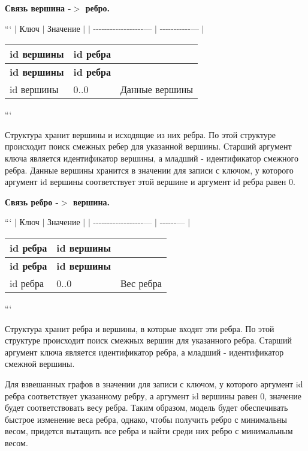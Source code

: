 \begin{DoxyEnumerate}
\item {\bfseries Связь вершина -\/$>$ ребро.}

``` $\vert$ Ключ $\vert$ Значение $\vert$ $\vert$ -\/-\/-\/-\/-\/-\/-\/-\/-\/-\/-\/-\/-\/-\/-\/-\/-\/-\/--- $\vert$ -\/-\/-\/-\/-\/-\/-\/-\/-\/-\/-\/--- $\vert$ \tabulinesep=1mm
\begin{longtabu} spread 0pt [c]{*{3}{|X[-1]}|}
\hline
\rowcolor{\tableheadbgcolor}\textbf{ id вершины }&\textbf{ id ребра }&\textbf{ }\\
\endfirsthead
\hline
\endfoot
\hline
\rowcolor{\tableheadbgcolor}\textbf{ id вершины }&\textbf{ id ребра }&\textbf{ }\\
\endhead
id вершины &0..0 &Данные вершины \\
\end{longtabu}
```

Структура хранит вершины и исходящие из них ребра. По этой структуре происходит поиск смежных ребер для указанной вершины. Старший аргумент ключа является идентификатор вершины, а младший -\/ идентификатор смежного ребра. Данные вершины хранится в значении для записи с ключом, у которого аргумент {\ttfamily id вершины} соответствует этой вершине и аргумент {\ttfamily id ребра} равен 0.
\item {\bfseries Связь ребро -\/$>$ вершина.}

``` $\vert$ Ключ $\vert$ Значение $\vert$ $\vert$ -\/-\/-\/-\/-\/-\/-\/-\/-\/-\/-\/-\/-\/-\/-\/-\/-\/-\/--- $\vert$ -\/-\/-\/-\/-\/-\/--- $\vert$ \tabulinesep=1mm
\begin{longtabu} spread 0pt [c]{*{3}{|X[-1]}|}
\hline
\rowcolor{\tableheadbgcolor}\textbf{ id ребра }&\textbf{ id вершины }&\textbf{ }\\
\endfirsthead
\hline
\endfoot
\hline
\rowcolor{\tableheadbgcolor}\textbf{ id ребра }&\textbf{ id вершины }&\textbf{ }\\
\endhead
id ребра &0..0 &Вес ребра \\
\end{longtabu}
```

Структура хранит ребра и вершины, в которые входят эти ребра. По этой структуре происходит поиск смежных вершин для указанного ребра. Старший аргумент ключа является идентификатор ребра, а младший -\/ идентификатор смежной вершины.

Для взвешанных графов в значении для записи с ключом, у которого аргумент {\ttfamily id ребра} соответствует указанному ребру, а аргумент {\ttfamily id вершины} равен 0, значение будет соответствовать весу ребра. Таким образом, модель будет обеспечивать быстрое изменение веса ребра, однако, чтобы получить ребро с минимальны весом, придется вытащить все ребра и найти среди них ребро с минимальным весом.
\end{DoxyEnumerate}

